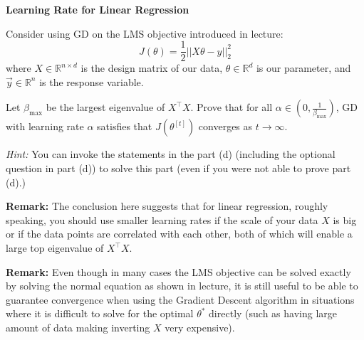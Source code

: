 \item {} {\bf Learning Rate for Linear Regression}

Consider using GD on the LMS objective introduced in lecture:
\begin{equation*}
	J(\theta) = \frac{1}{2}||X\theta - y||_2^2
\end{equation*}
where $X\in\mathbb{R}^{n\times d}$ is the design matrix of our data, $\theta\in\mathbb{R}^d$ is our parameter, and $\vec{y}\in\mathbb{R}^n$  is the response variable. 

Let $\beta_{\max}$ be the largest eigenvalue of $X^\top X$. Prove that for all  $\alpha \in (0, \frac{1}{\beta_{\max}})$, GD with learning rate $\alpha$ satisfies that $J(\theta^{[t]})$ converges as $t\rightarrow \infty.$
	
\textit{Hint:}	You can invoke the statements in the part (d) (including the optional question in part (d)) to solve this part (even if you were not able to prove part (d).)

\textbf{Remark:} The conclusion here suggests that for linear regression, roughly speaking, you should use smaller learning rates if the scale of your data $X$ is big or if the data points are correlated with each other, both of which will enable a large top eigenvalue of $X^\top X$.

\textbf{Remark:} Even though in many cases the LMS objective can be solved 
exactly by solving the normal equation as shown in lecture, it is still useful to be able to guarantee convergence
when using the Gradient Descent algorithm in situations where it is difficult to solve
for the optimal $\theta^*$ directly (such as having large amount of data making inverting $X$
very expensive).
